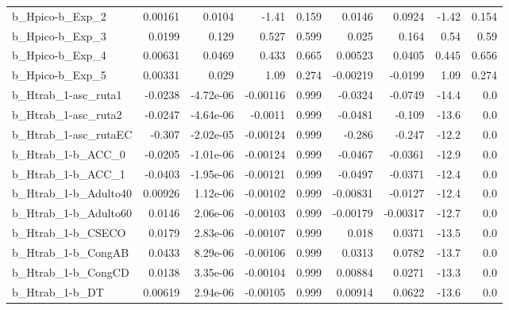 \begin{tabular}{lrrrrrrrr}
b\_Hpico-b\_Exp\_2            &     0.00161 &       0.0104 &    -1.41 &    0.159 &     0.0146 &      0.0924 &        -1.42 &         0.154 \\
b\_Hpico-b\_Exp\_3            &      0.0199 &        0.129 &    0.527 &    0.599 &      0.025 &       0.164 &         0.54 &          0.59 \\
b\_Hpico-b\_Exp\_4            &     0.00631 &       0.0469 &    0.433 &    0.665 &    0.00523 &      0.0405 &        0.445 &         0.656 \\
b\_Hpico-b\_Exp\_5            &     0.00331 &        0.029 &     1.09 &    0.274 &   -0.00219 &     -0.0199 &         1.09 &         0.274 \\
b\_Htrab\_1-asc\_ruta1        &     -0.0238 &    -4.72e-06 & -0.00116 &    0.999 &    -0.0324 &     -0.0749 &        -14.4 &           0.0 \\
b\_Htrab\_1-asc\_ruta2        &     -0.0247 &    -4.64e-06 &  -0.0011 &    0.999 &    -0.0481 &      -0.109 &        -13.6 &           0.0 \\
b\_Htrab\_1-asc\_rutaEC       &      -0.307 &    -2.02e-05 & -0.00124 &    0.999 &     -0.286 &      -0.247 &        -12.2 &           0.0 \\
b\_Htrab\_1-b\_ACC\_0          &     -0.0205 &    -1.01e-06 & -0.00124 &    0.999 &    -0.0467 &     -0.0361 &        -12.9 &           0.0 \\
b\_Htrab\_1-b\_ACC\_1          &     -0.0403 &    -1.95e-06 & -0.00121 &    0.999 &    -0.0497 &     -0.0371 &        -12.4 &           0.0 \\
b\_Htrab\_1-b\_Adulto40       &     0.00926 &     1.12e-06 & -0.00102 &    0.999 &   -0.00831 &     -0.0127 &        -12.4 &           0.0 \\
b\_Htrab\_1-b\_Adulto60       &      0.0146 &     2.06e-06 & -0.00103 &    0.999 &   -0.00179 &    -0.00317 &        -12.7 &           0.0 \\
b\_Htrab\_1-b\_CSECO          &      0.0179 &     2.83e-06 & -0.00107 &    0.999 &      0.018 &      0.0371 &        -13.5 &           0.0 \\
b\_Htrab\_1-b\_CongAB         &      0.0433 &     8.29e-06 & -0.00106 &    0.999 &     0.0313 &      0.0782 &        -13.7 &           0.0 \\
b\_Htrab\_1-b\_CongCD         &      0.0138 &     3.35e-06 & -0.00104 &    0.999 &    0.00884 &      0.0271 &        -13.3 &           0.0 \\
b\_Htrab\_1-b\_DT             &     0.00619 &     2.94e-06 & -0.00105 &    0.999 &    0.00914 &      0.0622 &        -13.6 &           0.0 \\

\end{tabular}
